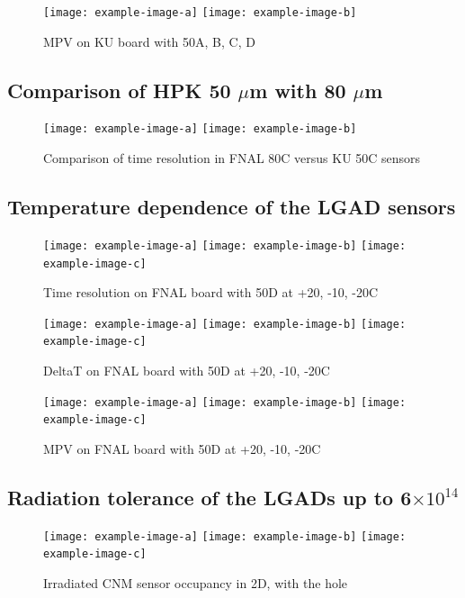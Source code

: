 \documentclass[preprint,1p]{elsarticle}
\begin{document}
\begin{figure}[htbp] 
\centering
\texttt{[image: example-image-a]} 
\texttt{[image: example-image-b]} 
\caption{MPV on KU board with 50A, B, C, D } 
\label{fig:Sensors} 
\end{figure} 



\subsection{Comparison of HPK 50 $\mu$m with 80 $\mu$m}

\begin{figure}[htbp] 
\centering
\texttt{[image: example-image-a]} 
\texttt{[image: example-image-b]} 
\caption{Comparison of time resolution in FNAL 80C versus KU 50C sensors } 
\label{fig:Sensors} 
\end{figure} 


\subsection{Temperature dependence of the LGAD sensors}

\begin{figure}[htbp] 
\centering
\texttt{[image: example-image-a]} 
\texttt{[image: example-image-b]} 
\texttt{[image: example-image-c]} 
\caption{Time resolution on FNAL board with 50D at +20, -10, -20C} 
\label{fig:Sensors} 
\end{figure} 

\begin{figure}[htbp] 
\centering
\texttt{[image: example-image-a]} 
\texttt{[image: example-image-b]} 
\texttt{[image: example-image-c]} 
\caption{DeltaT on FNAL board with 50D at +20, -10, -20C} 
\label{fig:Sensors} 
\end{figure} 


\begin{figure}[htbp] 
\centering
\texttt{[image: example-image-a]} 
\texttt{[image: example-image-b]} 
\texttt{[image: example-image-c]} 
\caption{MPV on FNAL board with 50D at +20, -10, -20C} 
\label{fig:Sensors} 
\end{figure} 

\subsection{Radiation tolerance of the LGADs up to 6$\times 10^{14}$}

\begin{figure}[htbp] 
\centering
\texttt{[image: example-image-a]} 
\texttt{[image: example-image-b]} 
\texttt{[image: example-image-c]} 
\caption{Irradiated CNM sensor occupancy in 2D, with the hole} 
\label{fig:Sensors} 
\end{figure} 
\end{document}
